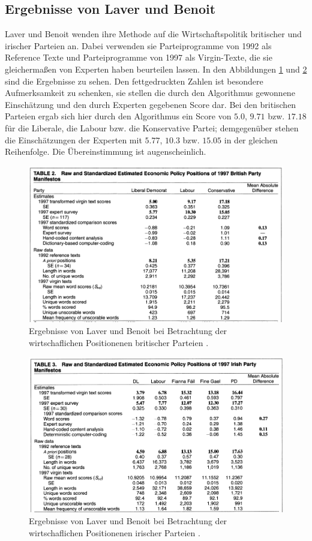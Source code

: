   
\subsection{Ergebnisse von Laver und Benoit} \label{LuBErgebnisse}
Laver und Benoit \cite{LuB} wenden ihre Methode auf die Wirtschaftspolitik britischer und irischer Parteien an. Dabei verwenden sie Parteiprogramme von 1992 als Reference Texte und Parteiprogramme von 1997 als Virgin-Texte, die sie gleichermaßen von Experten haben beurteilen lassen. In den Abbildungen \ref{fig:Tab2} und \ref{fig:Tab3} sind die Ergebnisse zu sehen. Den fettgedruckten Zahlen ist besondere Aufmerksamkeit zu schenken, sie stellen die durch den Algorithmus gewonnene Einschätzung und den durch Experten gegebenen Score dar. Bei den britischen Parteien ergab sich hier durch den Algorithmus ein Score von $5.0$, $9.71$ bzw. $17.18$ für die Liberale, die Labour bzw. die Konservative Partei; demgegenüber stehen die Einschätzungen der Experten mit $5.77$, $10.3$ bzw. $15.05$ in der gleichen Reihenfolge. Die Übereinstimmung ist augenscheinlich.

\begin{figure}
   \includegraphics[width=\textwidth]{images/Tab2_LuB.png}
   \caption{Ergebnisse von Laver und Benoit bei Betrachtung der wirtschaflichen Positionenen britischer Parteien \cite{LuB}.\label{fig:Tab2}}
\end{figure}
\begin{figure}
   \includegraphics[width=\textwidth]{images/Tab3_LuB.png}
   \caption{Ergebnisse von Laver und Benoit bei Betrachtung der wirtschaflichen Positionenen irischer Parteien \cite{LuB}. \label{fig:Tab3}}
\end{figure}

